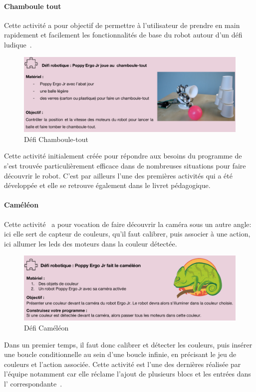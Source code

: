             \paragraph{Chamboule tout}
                Cette activité a pour objectif de permettre à l'utilisateur de prendre en main rapidement et facilement les fonctionnalités de base du robot autour d'un défi ludique~. 
                \begin{figure}[!h]
                    \centering
                    \includegraphics[width=0.8\linewidth]{Figures/Desprez-act_chamboule.png}
                    \caption{Défi Chamboule-tout}\label{fig:act_chamboule}
                \end{figure}\par%
                Cette activité initialement créée pour répondre aux besoins du programme de ~ s'est trouvée particulièrement efficace dans de nombreuses situations pour faire découvrir le robot. C'est par ailleurs l'une des premières activités qui a été développée et elle se retrouve également dans le livret pédagogique.
            \paragraph{Caméléon}
                Cette activité~ a pour vocation de faire découvrir la caméra sous un autre angle: ici elle sert de capteur de couleurs, qu'il faut calibrer, puis associer à une action, ici allumer les leds des moteurs dans la couleur détectée.
                \begin{figure}[!h]
                    \centering
                    \includegraphics[width=0.8\linewidth]{Figures/Desprez-act_cameleon.png}
                    \caption{Défi Caméléon}\label{fig:act_cameleon}
                \end{figure}\par%
                Dans un premier temps, il faut donc calibrer et détecter les couleurs, puis insérer une boucle conditionnelle au sein d'une boucle infinie, en précisant le jeu de couleurs et l'action associée.
                Cette activité est l'une des dernières réalisée par l'équipe notamment car elle réclame l'ajout de plusieurs blocs et les entrées dans l' correspondante~.
